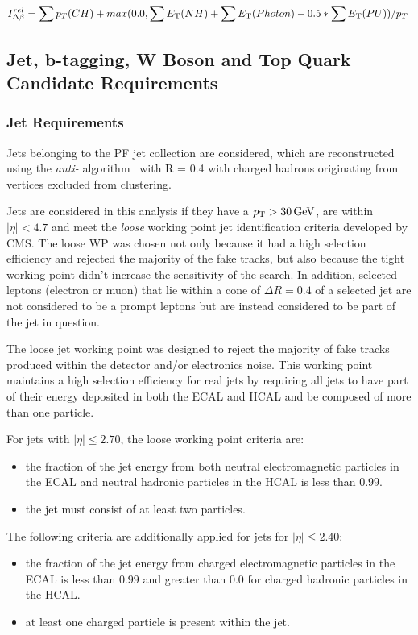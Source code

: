 \begin{equation}
I^{rel}_{\Delta\beta} = \sum p_T(CH) + max (0.0, \sum E_{\rm T}(NH) + \sum E_{\rm T}(Photon) - 0.5 * \sum E_{\rm T}(PU))/p_T \;
\end{equation}\label{eq:deltaBeta}

\subsection{Jet, b-tagging, W Boson and Top Quark Candidate Requirements}
\subsubsection{Jet Requirements}
Jets belonging to the PF jet collection are considered, which are reconstructed using the \emph{anti-\kt} algorithm~\cite{Cacciari:2008gp} with R = 0.4 with charged hadrons originating from \PU vertices excluded from clustering.

Jets are considered in this analysis if they have a $p_{\mathrm{T}} > 30\,\text{Ge\hspace{-.08em}V}$, are within $|\eta| < 4.7$ and meet the \emph{loose} working point jet identification criteria developed by CMS.
The loose WP was chosen not only because it had a high selection efficiency and rejected the majority of the fake tracks, but also because the tight working point didn't increase the sensitivity of the search.
In addition, selected leptons (electron or muon) that lie within a cone of $\Delta R = 0.4$ of a selected jet are not considered to be a prompt leptons but are instead considered to be part of the jet in question.

The loose jet working point was designed to reject the majority of fake tracks produced within the detector and/or electronics noise. 
This working point maintains a high selection efficiency for real jets by requiring all jets to have part of their energy deposited in both the ECAL and HCAL and be composed of more than one particle.

For jets with $|\eta| \leq 2.70$, the loose working point criteria are:
\begin{itemize}
\item the fraction of the jet energy from both neutral electromagnetic particles in the ECAL and neutral hadronic particles in the HCAL is less than $0.99$.
\item the jet must consist of at least two particles.
\end{itemize}

The following criteria are additionally applied for jets for $|\eta| \leq 2.40$:
\begin{itemize}
\item the fraction of the jet energy from charged electromagnetic particles in the ECAL is less than $0.99$ and greater than 0.0 for charged hadronic particles in the HCAL.
\item at least one charged particle is present within the jet.
\end{itemize}

